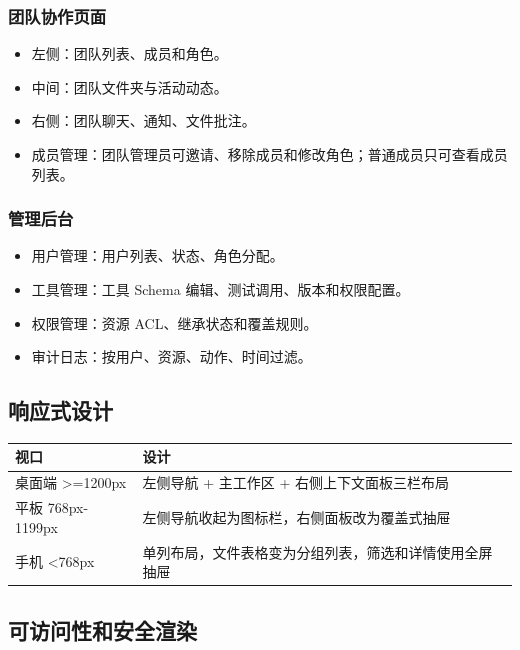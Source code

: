 \documentclass[a4paper,zihao=-4]{ctexart}
\providecommand{\tightlist}{%
  \setlength{\itemsep}{0pt}\setlength{\parskip}{0pt}}
\begin{document}
\hypertarget{ux56e2ux961fux534fux4f5cux9875ux9762}{%
\subsubsection{团队协作页面}\label{ux56e2ux961fux534fux4f5cux9875ux9762}}

\begin{itemize}
\tightlist
\item
  左侧：团队列表、成员和角色。
\item
  中间：团队文件夹与活动动态。
\item
  右侧：团队聊天、通知、文件批注。
\item
  成员管理：团队管理员可邀请、移除成员和修改角色；普通成员只可查看成员列表。
\end{itemize}

\hypertarget{ux7ba1ux7406ux540eux53f0}{%
\subsubsection{管理后台}\label{ux7ba1ux7406ux540eux53f0}}

\begin{itemize}
\tightlist
\item
  用户管理：用户列表、状态、角色分配。
\item
  工具管理：工具 Schema 编辑、测试调用、版本和权限配置。
\item
  权限管理：资源 ACL、继承状态和覆盖规则。
\item
  审计日志：按用户、资源、动作、时间过滤。
\end{itemize}

\hypertarget{ux54cdux5e94ux5f0fux8bbeux8ba1}{%
\subsection{响应式设计}\label{ux54cdux5e94ux5f0fux8bbeux8ba1}}

\begin{longtable}{|>{\raggedright\arraybackslash}p{2.4cm}|>{\raggedright\arraybackslash}p{\dimexpr(\linewidth-2.4cm-4\tabcolsep-3\arrayrulewidth)/1\relax}|}
\hline
视口 & 设计\tabularnewline
\hline
\endhead
桌面端 >=1200px & 左侧导航 + 主工作区 + 右侧上下文面板三栏布局\tabularnewline
\hline
平板 768px-1199px & 左侧导航收起为图标栏，右侧面板改为覆盖式抽屉\tabularnewline
\hline
手机 <768px & 单列布局，文件表格变为分组列表，筛选和详情使用全屏抽屉\tabularnewline
\hline
\end{longtable}

\hypertarget{ux53efux8bbfux95eeux6027ux548cux5b89ux5168ux6e32ux67d3}{%
\subsection{可访问性和安全渲染}\label{ux53efux8bbfux95eeux6027ux548cux5b89ux5168ux6e32ux67d3}}
\end{document}
